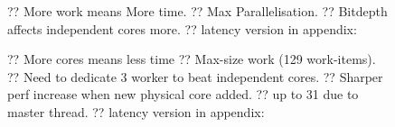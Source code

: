 \documentclass[sigconf,natbib=false]{acmart}
\begin{document}
\begin{figure}
	\caption{?? More work means More time. ?? Max Parallelisation. ?? Bitdepth affects independent cores more. ?? latency version in appendix: }
\end{figure}

\begin{figure}
	\caption{?? More cores means less time ?? Max-size work (129 work-items). ?? Need to dedicate 3 worker to beat independent cores. ?? Sharper perf increase when new physical core added. ?? up to 31 due to master thread. ?? latency version in appendix: }
\end{figure}
\end{document}
